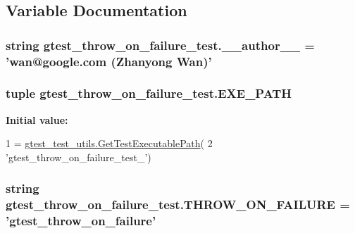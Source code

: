\subsection{Variable Documentation}
\hypertarget{namespacegtest__throw__on__failure__test_afd3c4d4809a79f0b4de8b2372cba5bb8}{
\subsubsection[{\-\_\-\-\_\-author\-\_\-\-\_\-}]{\setlength{\rightskip}{0pt plus 5cm}string gtest\-\_\-throw\-\_\-on\-\_\-failure\-\_\-test.\-\_\-\-\_\-author\-\_\-\-\_\- = 'wan@google.\-com (Zhanyong Wan)'}}\label{namespacegtest__throw__on__failure__test_afd3c4d4809a79f0b4de8b2372cba5bb8}
\hypertarget{namespacegtest__throw__on__failure__test_a21b57c780e17de8f6aa8c88652b290be}{
\subsubsection[{E\-X\-E\-\_\-\-P\-A\-T\-H}]{\setlength{\rightskip}{0pt plus 5cm}tuple gtest\-\_\-throw\-\_\-on\-\_\-failure\-\_\-test.\-E\-X\-E\-\_\-\-P\-A\-T\-H}}\label{namespacegtest__throw__on__failure__test_a21b57c780e17de8f6aa8c88652b290be}
{\bfseries Initial value\-:}
\begin{DoxyCode}
1 = \hyperlink{namespacegtest__test__utils_a1bdf3cac86afa675ed37629b183048e9}{gtest\_test\_utils.GetTestExecutablePath}(
2     \textcolor{stringliteral}{'gtest\_throw\_on\_failure\_test\_'})
\end{DoxyCode}
\hypertarget{namespacegtest__throw__on__failure__test_af837d05b7ed8498aed8202c1d83d1e7a}{
\subsubsection[{T\-H\-R\-O\-W\-\_\-\-O\-N\-\_\-\-F\-A\-I\-L\-U\-R\-E}]{\setlength{\rightskip}{0pt plus 5cm}string gtest\-\_\-throw\-\_\-on\-\_\-failure\-\_\-test.\-T\-H\-R\-O\-W\-\_\-\-O\-N\-\_\-\-F\-A\-I\-L\-U\-R\-E = 'gtest\-\_\-throw\-\_\-on\-\_\-failure'}}\label{namespacegtest__throw__on__failure__test_af837d05b7ed8498aed8202c1d83d1e7a}
